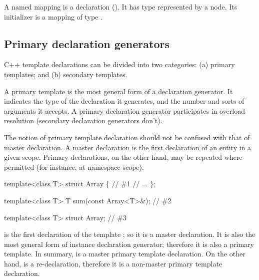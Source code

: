 \documentclass[11pt]{article}
\begin{document}
A named mapping is a declaration ().  It has type represented
by a  node.  Its initializer is a mapping of type
.



\subsection{Primary declaration generators}
\label{sec:named-mapping:primary}

C++ template declarations can be divided into two categories:
(a) primary templates; and (b) secondary templates.

A primary template is the most general form of a declaration generator.
It indicates the type of the declaration it generates, and the number and
sorts of arguments it accepts.  A primary declaration generator participates
in overload resolution (secondary declaration generators don't).

The notion of primary template declaration should not be confused with that of
master declaration.  A master declaration is the first  declaration of an
entity in a given scope.  Primary declarations, on the other hand, may be
repeated where permitted (for instance, at namespace scope).   
\begin{Program}
  template<class T>
     struct Array \{                         // \#1
        // ...
     \};
  
  template<class T>
     T sum(const Array<T>&);                // \#2
 
  template<class T> 
     struct Array;                          // \#3
\end{Program}
 is the first declaration of the template ; so it is 
a master declaration.  It is also the most general form of 
 instance declaration generator;
therefore it is also a primary template.  In summary,  is a master
primary template declaration.  On the other hand,  is a
re-declaration, therefore it is a non-master primary template declaration.
\end{document}
